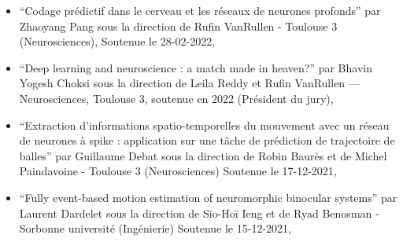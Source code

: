 \documentclass[10pt,french,a4paper,twoside]{article}%
\begin{document}
\begin{itemize}
	\item ``Codage prédictif dans le cerveau et les réseaux de neurones profonds'' 	par Zhaoyang Pang sous la direction de Rufin VanRullen - Toulouse 3 (Neurosciences), Soutenue le 28-02-2022,

    \item ``Deep learning and neuroscience : a match made in heaven?'' par Bhavin Yogesh Choksi sous la direction de Leila Reddy et Rufin VanRullen --- Neurosciences, Toulouse 3, soutenue en 2022 (Président du jury),

	\item ``Extraction d'informations spatio-temporelles du mouvement avec un réseau de neurones à spike : application sur une tâche de prédiction de trajectoire de balles'' par Guillaume Debat sous la direction de Robin Baurès et de Michel Paindavoine - Toulouse 3  (Neurosciences) 	Soutenue le 17-12-2021,

	\item ``Fully event-based motion estimation of neuromorphic binocular systems'' par Laurent Dardelet sous la direction de Sio-Hoï Ieng et de Ryad Benosman - Sorbonne université (Ingénierie) Soutenue le 15-12-2021,







\end{itemize}
\end{document}
